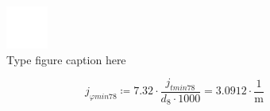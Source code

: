 \documentclass{article}
\newcommand{\defeq}{\coloneq} %
\begin{document}
\begin{figure}[h!]
 \begin{center}
  \includegraphics[max width=\textwidth]{calculations/876.png}
  \caption{Type figure caption here}
  \label{fig:876}
 \end{center}
\end{figure}
\begin{equation*}
\textit{j}_{\textit{φmin78}} \defeq 7.32 \cdot \frac{\textit{j}_{\textit{tmin78}}}{\textit{d}_{\textit{8}} \cdot 1000} = {3.0912 \cdot \frac{1}{\mathrm{m}}}
\end{equation*}
\end{document}
